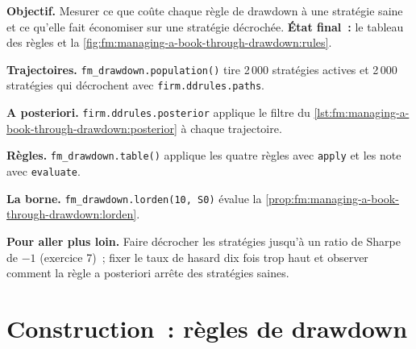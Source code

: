\begin{tutorial}
\textbf{Objectif.} Mesurer ce que coûte chaque règle de drawdown à une stratégie saine et ce qu'elle fait économiser sur une stratégie décrochée. \textbf{État final~:} le tableau des règles et
la \cref{fig:fm:managing-a-book-through-drawdown:rules}.
\begin{tutsteps}
\item \textbf{Trajectoires.} \texttt{fm\_drawdown.population()} tire 2\,000 stratégies actives et 2\,000 stratégies qui décrochent avec \texttt{firm.ddrules.paths}.
\item \textbf{A posteriori.} \texttt{firm.ddrules.posterior} applique le filtre du \cref{lst:fm:managing-a-book-through-drawdown:posterior} à chaque
trajectoire.
\item \textbf{Règles.} \texttt{fm\_drawdown.table()} applique les quatre règles avec \texttt{apply} et les note avec \texttt{evaluate}.
\item \textbf{La borne.} \texttt{fm\_drawdown.lorden(10, S0)} évalue la \cref{prop:fm:managing-a-book-through-drawdown:lorden}.
\end{tutsteps}
\end{tutorial}

\textbf{Pour aller plus loin.} Faire décrocher les stratégies jusqu'à un ratio de Sharpe de $-1$ (exercice 7)~; fixer le taux de hasard dix fois trop haut et observer comment la
règle a posteriori arrête des stratégies saines.

\section{Construction~: règles de drawdown}\label{bld:fm:managing-a-book-through-drawdown:ddrules}


